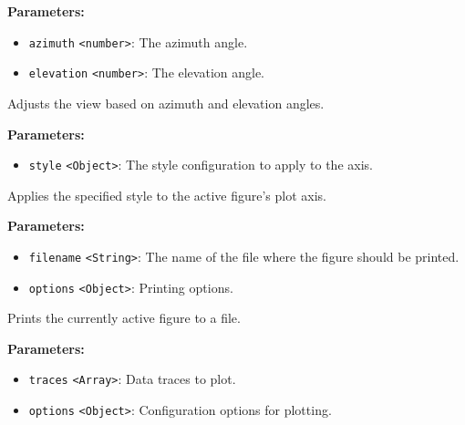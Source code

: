 \documentclass[12pt,a4paper]{article}
\begin{document}
\noindent \textbf{Parameters:}
\begin{itemize}
  \item \texttt{azimuth} \texttt{<number>}: The azimuth angle.
  \item \texttt{elevation} \texttt{<number>}: The elevation angle.
\end{itemize}

\noindent Adjusts the view based on azimuth and elevation angles.

\vspace{5mm}
\noindent {}


\noindent \textbf{Parameters:}
\begin{itemize}
  \item \texttt{style} \texttt{<Object>}: The style configuration to apply to the axis.
\end{itemize}

\noindent Applies the specified style to the active figure's plot axis.

\vspace{5mm}
\noindent {}


\noindent \textbf{Parameters:}
\begin{itemize}
  \item \texttt{filename} \texttt{<String>}: The name of the file where the figure should be printed.
  \item \texttt{options} \texttt{<Object>}: Printing options.
\end{itemize}

\noindent Prints the currently active figure to a file.

\vspace{5mm}
\noindent {}


\noindent \textbf{Parameters:}
\begin{itemize}
  \item \texttt{traces} \texttt{<Array>}: Data traces to plot.
  \item \texttt{options} \texttt{<Object>}: Configuration options for plotting.
\end{itemize}
\end{document}
